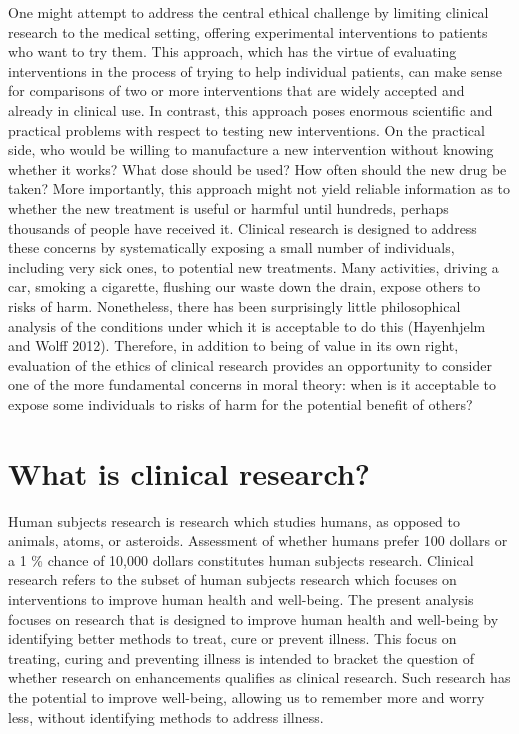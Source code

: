 \documentclass[12p]{article}
\begin{document}
One might attempt to address the central ethical challenge by limiting clinical research to the medical setting, offering experimental interventions to patients who want to try them. This approach, which has the virtue of evaluating interventions in the process of trying to help individual patients, can make sense for comparisons of two or more interventions that are widely accepted and already in clinical use. In contrast, this approach poses enormous scientific and practical problems with respect to testing new interventions. On the practical side, who would be willing to manufacture a new intervention without knowing whether it works? What dose should be used? How often should the new drug be taken? More importantly, this approach might not yield reliable information as to whether the new treatment is useful or harmful until hundreds, perhaps thousands of people have received it. Clinical research is designed to address these concerns by systematically exposing a small number of individuals, including very sick ones, to potential new treatments. Many activities, driving a car, smoking a cigarette, flushing our waste down the drain, expose others to risks of harm. Nonetheless, there has been surprisingly little philosophical analysis of the conditions under which it is acceptable to do this (Hayenhjelm and Wolff 2012). Therefore, in addition to being of value in its own right, evaluation of the ethics of clinical research provides an opportunity to consider one of the more fundamental concerns in moral theory: when is it acceptable to expose some individuals to risks of harm for the potential benefit of others?

\section{What is clinical research?}

Human subjects research is research which studies humans, as opposed to animals, atoms, or asteroids. Assessment of whether humans prefer 100 dollars or a 1 \% chance of 10,000 dollars constitutes human subjects research. Clinical research refers to the subset of human subjects research which focuses on interventions to improve human health and well-being. The present analysis focuses on research that is designed to improve human health and well-being by identifying better methods to treat, cure or prevent illness. This focus on treating, curing and preventing illness is intended to bracket the question of whether research on enhancements qualifies as clinical research. Such research has the potential to improve well-being, allowing us to remember more and worry less, without identifying methods to address illness.
\end{document}

